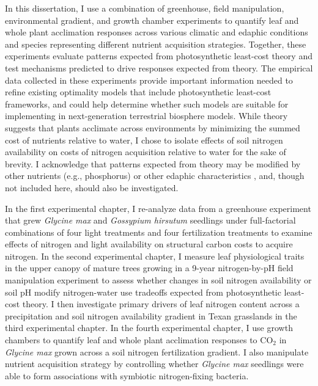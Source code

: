 In this dissertation, I use a combination of greenhouse, field manipulation, environmental gradient, and growth chamber experiments to quantify leaf and whole plant acclimation responses across various climatic and edaphic conditions and species representing different nutrient acquisition strategies. Together, these experiments evaluate patterns expected from photosynthetic least-cost theory and test mechanisms predicted to drive responses expected from theory. The empirical data collected in these experiments provide important information needed to refine existing optimality models that include photosynthetic least-cost frameworks, and could help determine whether such models are suitable for implementing in next-generation terrestrial biosphere models. While theory suggests that plants acclimate across environments by minimizing the summed cost of nutrients relative to water, I chose to isolate effects of soil nitrogen availability on costs of nitrogen acquisition relative to water for the sake of brevity. I acknowledge that patterns expected from theory may be modified by other nutrients (e.g., phosphorus) or other edaphic characteristics , and, though not included here, should also be investigated.

In the first experimental chapter, I re-analyze data from a greenhouse experiment that grew \textit{Glycine max} and \textit{Gossypium hirsutum} seedlings under full-factorial combinations of four light treatments and four fertilization treatments to examine effects of nitrogen and light availability on structural carbon costs to acquire nitrogen. In the second experimental chapter, I measure leaf physiological traits in the upper canopy of mature trees growing in a 9-year nitrogen-by-pH field manipulation experiment to assess whether changes in soil nitrogen availability or soil pH modify nitrogen-water use tradeoffs expected from photosynthetic least-cost theory. I then investigate primary drivers of leaf nitrogen content across a precipitation and soil nitrogen availability gradient in Texan grasslands in the third experimental chapter. In the fourth experimental chapter, I use growth chambers to quantify leaf and whole plant acclimation responses to CO$_2$ in \textit{Glycine max} grown across a soil nitrogen fertilization gradient. I also manipulate nutrient acquisition strategy by controlling whether \textit{Glycine max} seedlings were able to form associations with symbiotic nitrogen-fixing bacteria.

